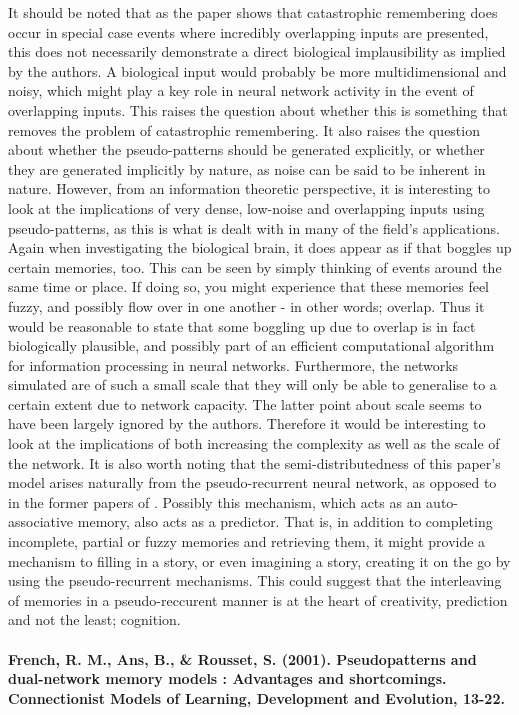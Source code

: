 It should be noted that as the paper shows that catastrophic remembering does occur in special case events where incredibly overlapping inputs are presented, this does not necessarily demonstrate a direct biological implausibility as implied by the authors. A biological input would probably be more multidimensional and noisy, which might play a key role in neural network activity in the event of overlapping inputs. This raises the question about whether this is something that removes the problem of catastrophic remembering. It also raises the question about whether the pseudo-patterns should be generated explicitly, or whether they are generated implicitly by nature, as noise can be said to be inherent in nature. However, from an information theoretic perspective, it is interesting to look at the implications of very dense, low-noise and overlapping inputs using pseudo-patterns, as this is what is dealt with in many of the field's applications. Again when investigating the biological brain, it does appear as if that boggles up certain memories, too. This can be seen by simply thinking of events around the same time or place. If doing so, you might experience that these memories feel fuzzy, and possibly flow over in one another - in other words; overlap. Thus it would be reasonable to state that some boggling up due to overlap is in fact biologically plausible, and possibly part of an efficient computational algorithm for information processing in neural networks. Furthermore, the networks simulated are of such a small scale that they will only be able to generalise to a certain extent due to network capacity. The latter point about scale seems to have been largely ignored by the authors. Therefore it would be interesting to look at the implications of both increasing the complexity as well as the scale of the network. It is also worth noting that the semi-distributedness of this paper's model arises naturally from the pseudo-recurrent neural network, as opposed to in the former papers of \cite{French1992, French1994}. Possibly this mechanism, which acts as an auto-associative memory, also acts as a predictor. That is, in addition to completing incomplete, partial or fuzzy memories and retrieving them, it might provide a mechanism to filling in a story, or even imagining a story, creating it on the go by using the pseudo-recurrent mechanisms. This could suggest that the interleaving of memories in a pseudo-reccurent manner is at the heart of creativity, prediction and not the least; cognition.
\\
\\
\textbf{French, R. M., Ans, B., \& Rousset, S. (2001). Pseudopatterns and dual-network memory models : Advantages and shortcomings. Connectionist Models of Learning, Development and Evolution, 13-22.}

